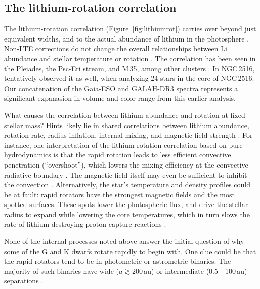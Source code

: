 \documentclass[12pt,twocolumn,tighten]{aastex63}
\newcommand{\cn}{NGC\,2516} %
\begin{document}
\subsection{The lithium-rotation correlation}
\label{discussion:lithium}

The lithium-rotation correlation (Figure~\ref{fig:lithiumrot}) carries
over beyond just equivalent widths, and to the actual abundance of
lithium in the photosphere \citep{soderblom_evolution_1993}.  Non-LTE
corrections do not change the overall relationships between Li
abundance and stellar temperature or rotation
\citep{carlsson_1994,lind_departures_2009}.  The correlation has been
seen in the Pleiades, the Psc-Eri stream, and M\,35, among other
clusters
\citep{bouvier_pleiades_lirot_2018,arancibia_2020,jeffries_m35_li_2020,hawkins_2020}.
In \cn, \citet{jeffries_rotation_1998} tentatively observed it as
well, when analyzing 24 stars in the core of \cn.  Our concatenation
of the Gaia-ESO and GALAH-DR3 spectra represents a significant
expanasion in volume and color range from this earlier analysis.

What causes the correlation between lithium abundance and rotation at
fixed stellar mass?  Hints likely lie in shared correlations between lithium
abundance, rotation rate, radius inflation, internal mixing, and
magnetic field strength
\citep{chabrier_evolution_2007,somers_measurement_2017,jeffries_m35_li_2020}.
For instance, one interpretation of the lithium-rotation correlation
based on pure hydrodynamics is that the rapid rotation leads to less
efficient convective penetration (``overshoot''), which lowers the mixing
efficiency at the convective-radiative boundary
\citep{baraffe_lithium_2017}.  The magnetic field itself may even be
sufficient to inhibit the convection \citep{ventura_Li_B_1998}.
Alternatively, the star's temperature and density profiles could be at fault: rapid rotators
have the strongest magnetic fields and the most spotted surfaces.
These spots lower the photospheric flux, and drive the stellar radius
to expand while lowering the core temperatures, which in turn slows
the rate of lithium-destroying proton capture reactions
\citep{feiden_magnetic_2013,somers_rotation_2015}.  

None of the internal processes noted above answer the initial
question of why some of the G and K dwarfs rotate rapidly to begin
with.  One clue could be that the rapid rotators tend to be in
photometric or astrometric binaries.  The majority of such binaries
have wide ($a\gtrsim200$\,au) or intermediate (0.5 - 100\,au)
separations \citep{raghavan_survey_2010}.
\end{document}
